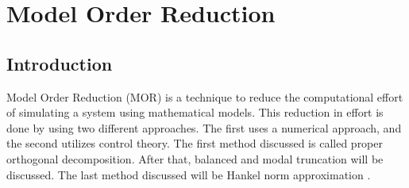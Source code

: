 \nopagebreak
\chapter{Model Order Reduction}
\section{Introduction}
Model Order Reduction (MOR) is a technique to reduce the computational effort of simulating a system using mathematical models.
This reduction in effort is done by using two different approaches. The first uses a numerical approach, and the second utilizes control theory.
The first method discussed is called proper orthogonal decomposition. After that, balanced and modal truncation will be discussed.
The last method discussed will be Hankel norm approximation \cite{+2021}.